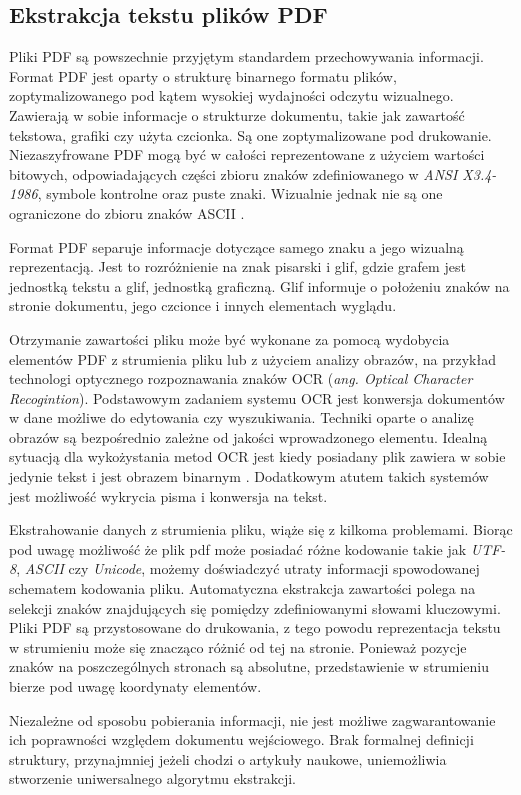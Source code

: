 \documentclass[12pt,a4paper,twoside]{article}
\begin{document}
\subsection{Ekstrakcja tekstu plików PDF}
Pliki PDF są powszechnie przyjętym standardem przechowywania informacji. Format PDF jest oparty o strukturę binarnego formatu plików, zoptymalizowanego pod kątem wysokiej wydajności odczytu wizualnego. Zawierają w sobie informacje o strukturze dokumentu, takie jak zawartość tekstowa, grafiki czy użyta czcionka. Są one zoptymalizowane pod drukowanie. Niezaszyfrowane PDF mogą być w całości reprezentowane z użyciem wartości bitowych, odpowiadających części zbioru znaków zdefiniowanego w \textit{ANSI X3.4-1986}, symbole kontrolne oraz puste znaki. Wizualnie jednak nie są one ograniczone do zbioru znaków ASCII \cite{ISO32000}.\par
Format PDF separuje informacje dotyczące samego znaku a jego wizualną reprezentacją. Jest to rozróżnienie na znak pisarski i glif, gdzie grafem jest jednostką tekstu a glif, jednostką graficzną. Glif informuje o położeniu znaków na stronie dokumentu, jego czcionce i innych elementach wyglądu. \par
Otrzymanie zawartości pliku może być wykonane za pomocą wydobycia elementów PDF z strumienia pliku lub z użyciem analizy obrazów, na przykład technologi optycznego rozpoznawania znaków OCR (\textit{ang. Optical Character Recogintion}). 
Podstawowym zadaniem systemu OCR jest konwersja dokumentów w dane możliwe do edytowania czy wyszukiwania. Techniki oparte o analizę obrazów są bezpośrednio zależne od jakości wprowadzonego elementu. Idealną sytuacją dla wykożystania metod OCR jest kiedy posiadany plik zawiera w sobie jedynie tekst i jest obrazem binarnym \cite{mithe2013optical}. Dodatkowym atutem takich systemów jest możliwość wykrycia pisma i konwersja na tekst.\par
Ekstrahowanie danych z strumienia pliku, wiąże się z kilkoma problemami. Biorąc pod uwagę możliwość że plik pdf może posiadać różne kodowanie takie jak \textit{UTF-8}, \textit{ASCII} czy \textit{Unicode}, możemy doświadczyć utraty informacji spowodowanej schematem kodowania pliku. Automatyczna ekstrakcja zawartości polega na selekcji znaków znajdujących się pomiędzy zdefiniowanymi słowami kluczowymi. Pliki PDF są przystosowane do drukowania, z tego powodu reprezentacja tekstu w strumieniu może się znacząco różnić od tej na stronie. Ponieważ pozycje znaków na poszczególnych stronach są absolutne, przedstawienie w strumieniu bierze pod uwagę koordynaty elementów.\par
Niezależne od sposobu pobierania informacji, nie jest możliwe zagwarantowanie ich poprawności względem dokumentu wejściowego. Brak formalnej definicji struktury, przynajmniej jeżeli chodzi o artykuły naukowe, uniemożliwia stworzenie uniwersalnego algorytmu ekstrakcji.
\newpage
\end{document}
